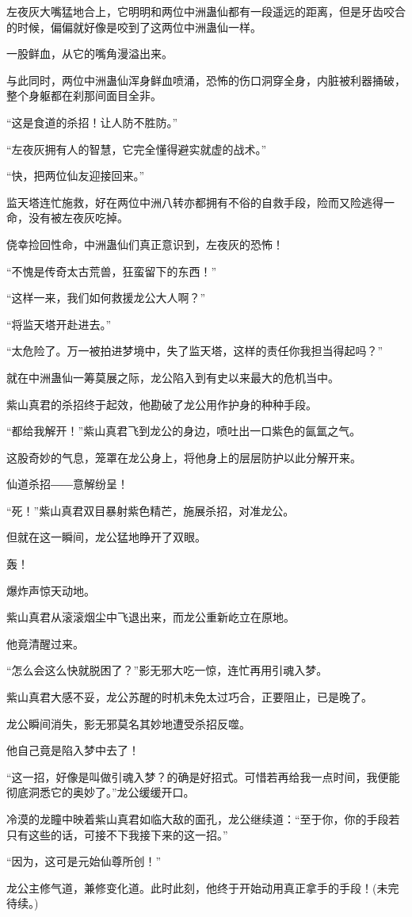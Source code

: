 \begin{this_body}
左夜灰大嘴猛地合上，它明明和两位中洲蛊仙都有一段遥远的距离，但是牙齿咬合的时候，偏偏就好像是咬到了这两位中洲蛊仙一样。

一股鲜血，从它的嘴角漫溢出来。

与此同时，两位中洲蛊仙浑身鲜血喷涌，恐怖的伤口洞穿全身，内脏被利器捅破，整个身躯都在刹那间面目全非。

“这是食道的杀招！让人防不胜防。”

“左夜灰拥有人的智慧，它完全懂得避实就虚的战术。”

“快，把两位仙友迎接回来。”

监天塔连忙施救，好在两位中洲八转亦都拥有不俗的自救手段，险而又险逃得一命，没有被左夜灰吃掉。

侥幸捡回性命，中洲蛊仙们真正意识到，左夜灰的恐怖！

“不愧是传奇太古荒兽，狂蛮留下的东西！”

“这样一来，我们如何救援龙公大人啊？”

“将监天塔开赴进去。”

“太危险了。万一被拍进梦境中，失了监天塔，这样的责任你我担当得起吗？”

就在中洲蛊仙一筹莫展之际，龙公陷入到有史以来最大的危机当中。

紫山真君的杀招终于起效，他勘破了龙公用作护身的种种手段。

“都给我解开！”紫山真君飞到龙公的身边，喷吐出一口紫色的氤氲之气。

这股奇妙的气息，笼罩在龙公身上，将他身上的层层防护以此分解开来。

仙道杀招――意解纷呈！

“死！”紫山真君双目暴射紫色精芒，施展杀招，对准龙公。

但就在这一瞬间，龙公猛地睁开了双眼。

轰！

爆炸声惊天动地。

紫山真君从滚滚烟尘中飞退出来，而龙公重新屹立在原地。

他竟清醒过来。

“怎么会这么快就脱困了？”影无邪大吃一惊，连忙再用引魂入梦。

紫山真君大感不妥，龙公苏醒的时机未免太过巧合，正要阻止，已是晚了。

龙公瞬间消失，影无邪莫名其妙地遭受杀招反噬。

他自己竟是陷入梦中去了！

“这一招，好像是叫做引魂入梦？的确是好招式。可惜若再给我一点时间，我便能彻底洞悉它的奥妙了。”龙公缓缓开口。

冷漠的龙瞳中映着紫山真君如临大敌的面孔，龙公继续道：“至于你，你的手段若只有这些的话，可接不下我接下来的这一招。”

“因为，这可是元始仙尊所创！”

龙公主修气道，兼修变化道。此时此刻，他终于开始动用真正拿手的手段！(未完待续。)

\end{this_body}

